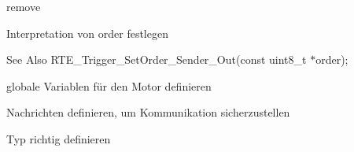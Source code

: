
\begin{DoxyRefList}
\item[\label{todo__todo000004}%
\hypertarget{todo__todo000004}{}%
Global \hyperlink{_y_a_s_a__types_8h_a32998811e852c17f709510545817cfde}{D\-U\-M\-M\-Y\-M\-E\-S\-S\-A\-G\-E} ]remove  
\item[\label{todo__todo000002}%
\hypertarget{todo__todo000002}{}%
Global \hyperlink{_y_a_s_a___r_t_e_a_p_i_8h_ab04087938919c2afceea75a4f2cd4621}{R\-T\-E\-\_\-\-Schussanlage\-\_\-\-Get\-Order\-\_\-\-Receiver\-\_\-\-In} (const Y\-A\-S\-A\-\_\-message $\ast$message)]Interpretation von order festlegen \begin{DoxySeeAlso}{See Also}
R\-T\-E\-\_\-\-Trigger\-\_\-\-Set\-Order\-\_\-\-Sender\-\_\-\-Out(const uint8\-\_\-t $\ast$order);  
\end{DoxySeeAlso}

\item[\label{todo__todo000001}%
\hypertarget{todo__todo000001}{}%
Global \hyperlink{_y_a_s_a___r_t_e_a_p_i_8h_abb336eca805711d79288c158e9c64508}{R\-T\-E\-\_\-\-Schuss\-Motor\-\_\-\-Get\-Order\-\_\-\-Receiver\-\_\-\-In} (const Y\-A\-S\-A\-\_\-message $\ast$message)]globale Variablen für den Motor definieren 
\item[\label{todo__todo000003}%
\hypertarget{todo__todo000003}{}%
Global \hyperlink{_y_a_s_a___r_t_e_a_p_i_8h_a44badf70548d98836720d9d61fd2e550}{R\-T\-E\-\_\-\-Trigger\-\_\-\-Get\-Message\-\_\-\-Server\-\_\-\-In} (const Y\-A\-S\-A\-\_\-message $\ast$message)]Nachrichten definieren, um Kommunikation sicherzustellen  
\item[\label{todo__todo000005}%
\hypertarget{todo__todo000005}{}%
Global \hyperlink{_y_a_s_a__types_8h_a195ef78acb1edefc968c447d077e6dda}{Y\-A\-S\-A\-\_\-message} ]Typ richtig definieren 
\end{DoxyRefList}